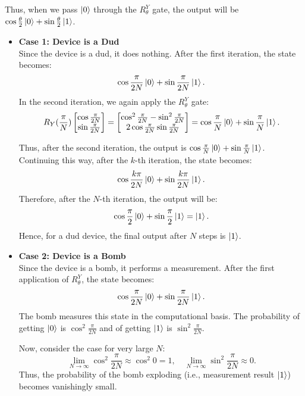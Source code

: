 Thus, when we pass $\ket{0}$ through the $R^Y_{\theta}$ gate, the output will be $\cos\frac{\theta}{2}\ket{0} + \sin\frac{\theta}{2}\ket{1}$.

\begin{itemize}
    \item \textbf{Case 1: Device is a Dud} \\
    Since the device is a dud, it does nothing. After the first iteration, the state becomes:
    \[
        \cos\frac{\pi}{2N}\ket{0} + \sin\frac{\pi}{2N}\ket{1}.
    \]
    In the second iteration, we again apply the $R^Y_{\theta}$ gate:
    \[
        R_Y({\frac{\pi}{N}})
        \begin{bmatrix}
            \cos\frac{\pi}{2N} \\
            \sin\frac{\pi}{2N} \\
        \end{bmatrix}
        =
        \begin{bmatrix}
            \cos^2\frac{\pi}{2N} - \sin^2\frac{\pi}{2N} \\
            2\cos\frac{\pi}{2N} \sin\frac{\pi}{2N} \\
        \end{bmatrix}
        =
        \cos\frac{\pi}{N}\ket{0} + \sin\frac{\pi}{N}\ket{1}.
    \]

    Thus, after the second iteration, the output is $\cos\frac{\pi}{N}\ket{0} + \sin\frac{\pi}{N}\ket{1}$. Continuing this way, after the $k$-th iteration, the state becomes:
    \[
        \cos\frac{k\pi}{2N}\ket{0} + \sin\frac{k\pi}{2N}\ket{1}.
    \]
    Therefore, after the $N$-th iteration, the output will be:
    \[
        \cos\frac{\pi}{2}\ket{0} + \sin\frac{\pi}{2}\ket{1} = \ket{1}.
    \]
    Hence, for a dud device, the final output after $N$ steps is $\ket{1}$.

    \item \textbf{Case 2: Device is a Bomb} \\
    Since the device is a bomb, it performs a measurement. After the first application of $R^Y_{\theta}$, the state becomes:
    \[
        \cos\frac{\pi}{2N}\ket{0} + \sin\frac{\pi}{2N}\ket{1}.
    \]
    The bomb measures this state in the computational basis. The probability of getting $\ket{0}$ is $\cos^2\frac{\pi}{2N}$ and of getting $\ket{1}$ is $\sin^2\frac{\pi}{2N}$.

    Now, consider the case for very large $N$:
    \[
        \lim_{N \to \infty} \cos^2\frac{\pi}{2N} \approx \cos^2 0 = 1, \quad \lim_{N \to \infty} \sin^2\frac{\pi}{2N} \approx 0.
    \]
    Thus, the probability of the bomb exploding (i.e., measurement result $\ket{1}$) becomes vanishingly small.


\end{itemize}

